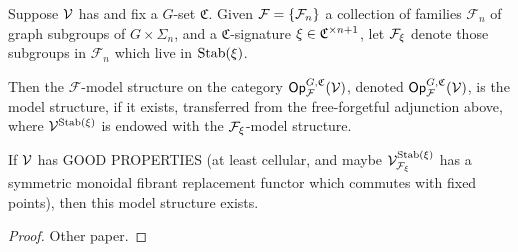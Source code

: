 \documentclass[psamsfonts,oneside,10pt,letterpaper
,draft
]{amsart}%
\renewcommand{\F}{\mathcal F}
\renewcommand{\H}{\ensuremath{\mathbb{H}}}
\renewcommand{\1}{\ensuremath{\mathbb{id}}}
\begin{document}
\begin{definition}
      Suppose $\mathcal V$ has
      and fix a $G$-set $\mathfrak C$.
      Given $\F = \set{\F_n}$ a collection of families $\F_n$ of graph subgroups of $G \times \Sigma_n$,
      and a $\mathfrak C$-signature $\xi \in \mathfrak C^{\times n+1}$,
      let $\F_\ksi$ denote those subgroups in $\F_n$ which live in $\mathrm{Stab}(\xi)$.

      Then the $\F$-model structure on the category $\Op^{G,\mathfrak C}_\F(\V)$, denoted $\Op^{G,\mathfrak C}_\F(\V)$,
      is the model structure, if it exists, transferred from the free-forgetful adjunction above,
      where $\mathcal V^{\mathrm{Stab}(\xi)}$ is endowed with the $\F_\ksi$-model structure.
\end{definition}
\begin{proposition}
      If $\mathcal V$ has {\color{red} GOOD PROPERTIES}
      (at least cellular, and maybe
      $\V^{\Stab(\ksi)}_{\F_\ksi}$ has a symmetric monoidal fibrant replacement functor which commutes with fixed points),
      then this model structure exists.
\end{proposition}
\begin{proof}
      Other paper.
\end{proof}
\end{document}
